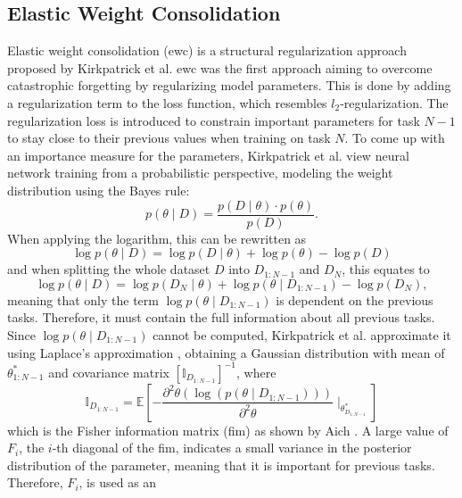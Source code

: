 \subsection{Elastic Weight Consolidation}
\label{sec:Related_work:Continual_Learning:EWC}
Elastic weight consolidation (\gls{ewc}) \cite{kirkpatrick2017overcoming} is a structural regularization approach proposed by Kirkpatrick et al.
\gls{ewc} was the first approach aiming to overcome catastrophic forgetting by regularizing model parameters. This is done by adding a regularization
term to the loss function, which resembles $l_2$-regularization. The regularization loss is introduced to constrain important parameters for
task $N-1$ to stay close to their previous values when training on task $N$. To come up with an importance measure for the parameters,
Kirkpatrick et al. view neural network training from a probabilistic perspective, modeling the weight distribution using the Bayes rule:
\begin{equation}
    p(\theta \mid D) = \frac{p(D \mid \theta) \cdot p(\theta)}{p(D)}.
\end{equation}
When applying the logarithm, this can be rewritten as
\begin{equation}
    \log p(\theta \mid D) = \log p(D \mid \theta) + \log p(\theta) - \log p(D)
\end{equation}
and when splitting the whole dataset $D$ into $D_{1:N-1}$ and $D_N$, this equates to
\begin{equation}
    \log p(\theta \mid D) = \log p(D_N \mid \theta) + \log p(\theta \mid D_{1:N-1}) - \log p(D_N),
\end{equation}
meaning that only the term $\log p(\theta \mid D_{1:N-1})$ is dependent on the previous tasks. Therefore, it must contain the full information 
about all previous tasks. Since $\log p(\theta \mid D_{1:N-1})$ cannot be computed, Kirkpatrick et al. approximate it using Laplace's approximation
\cite{mackay2003information}, obtaining a Gaussian distribution with mean of $\theta^*_{1:N-1}$ and covariance matrix $[\mathbb{I}_{D_{1:N-1}}]^{-1}$,
where
\begin{equation}
    \mathbb{I}_{D_{1:N-1}} = \mathbb{E} [- \frac{\partial^2 \theta (\log (p(\theta \mid D_{1:N-1})))}{\partial^2 \theta} \mid_{\theta^*_{D_{1:N-1}}}]
\end{equation} 
which is the Fisher information matrix (\gls{fim}) as shown by Aich \cite{aich2021elastic}. A large value of $F_i$, the $i$-th diagonal of the \gls{fim},
indicates a small variance in the posterior distribution of the parameter, meaning that it is important for previous tasks. Therefore, $F_i$, is used as an
